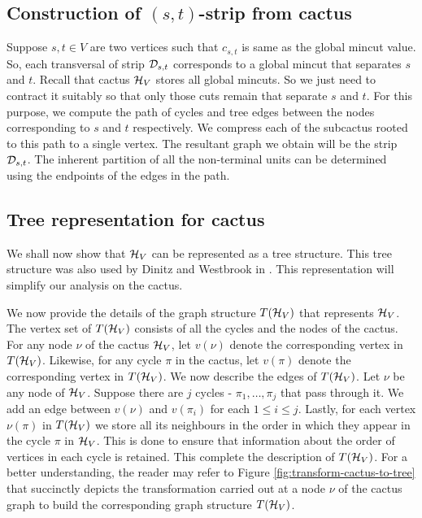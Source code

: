 \subsection{Construction of $(s,t)$-strip from cactus}
\label{sec:construction-strip-cactus}
Suppose $s,t \in V$ are two vertices such that $c_{s,t}$ is same as the global mincut value. 
So, each transversal of strip ${\cal D}_{s,t}$ corresponds to a global mincut that separates $s$ and $t$. Recall that cactus ${\cal H}_V$ stores all global mincuts. So we just need to contract it suitably so that only those cuts remain that separate $s$ and $t$. For this purpose,
we compute the path of cycles and tree edges between the nodes corresponding to $s$ and $t$ respectively. We compress each of the subcactus rooted to this path to a single vertex. The resultant graph we obtain will be the strip ${\cal D}_{s,t}$. The inherent partition of all the non-terminal units can be determined using the endpoints of the edges in the path.

\subsection{Tree representation for cactus}


We shall now show that ${\cal H}_V$ can be represented as a tree structure. This tree structure was also used by Dinitz and Westbrook in \cite{DBLP:journals/algorithmica/DinitzW98}. This representation will simplify our analysis on the cactus.

We now provide the details of the graph structure $T({\cal H}_V)$ that represents ${\cal H}_V$. The vertex set of $T({\cal H}_V)$ consists of all the cycles and the nodes of the cactus. For any node $\nu$ of the cactus ${\cal H}_V$, let $v(\nu)$ denote the corresponding vertex in $T({\cal H}_V)$. Likewise, for any cycle $\pi$ in the cactus, let $v(\pi)$ denote the corresponding vertex in $T({\cal H}_V)$. We now describe the edges of  $T({\cal H}_V)$. Let $\nu$ be any node of ${\cal H}_V$. Suppose there are $j$ cycles - $\pi_1,\ldots,\pi_j$ that pass through it. We add an edge between $v(\nu)$ and $v(\pi_i)$ for each $1\le i\le j$. Lastly, for each vertex $\nu(\pi)$ in $T{({\cal H}_V)}$ we store all its neighbours in the order in which they appear in the cycle $\pi$ in ${\cal H}_V$. This is done to ensure that information about the order of vertices in each cycle is retained. This complete the description of $T({\cal H}_V)$. For a better understanding, the reader may refer to Figure \ref{fig:transform-cactus-to-tree} that succinctly depicts the transformation carried out at a node $\nu$ of the cactus graph to build the corresponding graph structure $T({\cal H}_V)$. 

